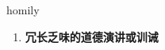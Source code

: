 
\begin{frame}
{\huge homily}
\begin{center}
\begin{enumerate}\Large
  \item \textbf{冗长乏味的道德演讲或训诫}
\end{enumerate}
\end{center}
\end{frame}
